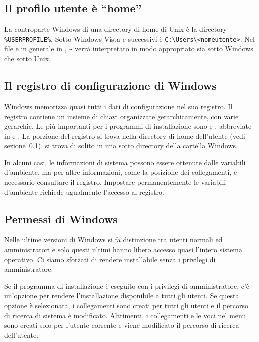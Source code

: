 \documentclass{article}
\begin{document}
\subsection{Il profilo utente è ``home''}
\label{sec:winhome}

La controparte Windows di una directory di home di Unix è la directory
\verb|%USERPROFILE%|. Sotto Windows Vista e successivi è
\verb|C:\Users\<nomeutente>|. Nel file
 e in
generale in \KPS{}, \verb|~| verrà interpretato in modo appropriato sia
sotto Windows che sotto Unix.


\subsection{Il registro di configurazione di Windows}
\label{sec:registry}

Windows memorizza quasi tutti i dati di configurazione nel suo registro.
Il registro contiene un insieme di chiavi organizzate gerarchicamente,
con varie gerarchie. Le più importanti per i programmi di installazione
sono  e , abbreviate in
 e . La porzione  del registro si trova
nella directory di home dell'utente (vedi sezione~\ref{sec:winhome}).
 si trova di solito in una sotto directory della cartella
Windows.

In alcuni casi, le informazioni di sistema possono essere ottenute dalle
variabili d'ambiente, ma per altre informazioni, come la posizione dei
collegamenti, è necessario consultare il registro. Impostare
permanentemente le variabili d'ambiente richiede ugualmente l'accesso al
registro.


\subsection{Permessi di Windows}
\label{sec:winpermissions}

Nelle ultime versioni di Windows si fa distinzione tra utenti normali ed
amministratori e solo questi ultimi hanno libero accesso quasi l'intero
sistema operativo. Ci siamo sforzati di rendere \TL{} installabile senza i
privilegi di amministratore.

Se il programma di installazione è eseguito con i privilegi di
amministratore, c'è un'opzione per rendere l'installazione disponibile a
tutti gli utenti. Se questa opzione è selezionata, i collegamenti sono
creati per tutti gli utenti e il percorso di ricerca di sistema è modificato.
Altrimenti, i collegamenti e le voci nel menu sono creati solo per
l'utente corrente e viene modificato il percorso di ricerca dell'utente.
\end{document}

